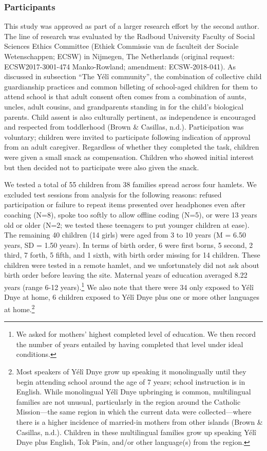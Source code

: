 \documentclass[english,,man,floatsintext]{apa6}
\begin{document}
\hypertarget{participants}{%
\subsubsection{Participants}\label{participants}}

This study was approved as part of a larger research effort by the second author. The line of research was evaluated by the Radboud University Faculty of Social Sciences Ethics Committee (Ethiek Commissie van de faculteit der Sociale Wetenschappen; ECSW) in Nijmegen, The Netherlands (original request: ECSW2017-3001-474 Manko-Rowland; amendment: ECSW-2018-041). As discussed in subsection \enquote{The Yélî community}, the combination of collective child guardianship practices and common billeting of school-aged children for them to attend school is that adult consent often comes from a combination of aunts, uncles, adult cousins, and grandparents standing in for the child's biological parents. Child assent is also culturally pertinent, as independence is encouraged and respected from toddlerhood (Brown \& Casillas, n.d.). Participation was voluntary; children were invited to participate following indication of approval from an adult caregiver. Regardless of whether they completed the task, children were given a small snack as compensation. Children who showed initial interest but then decided not to participate were also given the snack.

We tested a total of 55 children from 38 families spread across four hamlets. We excluded test sessions from analysis for the following reasons: refused participation or failure to repeat items presented over headphones even after coaching (N=8), spoke too softly to allow offline coding (N=5), or were 13 years old or older (N=2; we tested these teenagers to put younger children at ease). The remaining 40 children (14 girls) were aged from 3 to 10 years (M = 6.50 years, SD = 1.50 years). In terms of birth order, 6 were first borns, 5 second, 2 third, 7 forth, 5 fifth, and 1 sixth, with birth order missing for 14 children. These children were tested in a remote hamlet, and we unfortunately did not ask about birth order before leaving the site. Maternal years of education averaged 8.22 years (range 6-12 years).\footnote{We asked for mothers' highest completed level of education. We then record the number of years entailed by having completed that level under ideal conditions.} We also note that there were 34 only exposed to Yélî Dnye at home, 6 children exposed to Yélî Dnye plus one or more other languages at home.\footnote{Most speakers of Yélî Dnye grow up speaking it monolingually until they begin attending school around the age of 7 years; school instruction is in English. While monolingual Yélî Dnye upbringing is common, multilingual families are not unusual, particularly in the region around the Catholic Mission---the same region in which the current data were collected---where there is a higher incidence of married-in mothers from other islands (Brown \& Casillas, n.d.). Children in these multilingual families grow up speaking Yélî Dnye plus English, Tok Pisin, and/or other language(s) from the region.}
\end{document}
